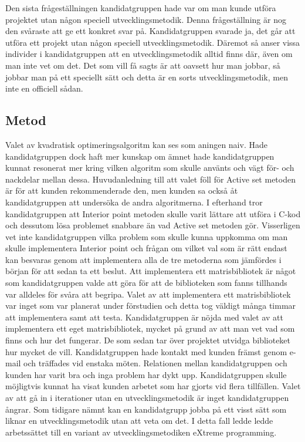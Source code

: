 \newline
\newline
Den sista frågeställningen kandidatgruppen hade var om man kunde utföra projektet utan någon speciell utvecklingsmetodik. Denna frågeställning är nog den svåraste att ge ett konkret svar på. Kandidatgruppen svarade ja, det går att utföra ett projekt utan någon speciell utvecklingsmetodik. Däremot så anser vissa individer i kandidatgruppen att en utvecklingsmetodik alltid finns där, även om man inte vet om det. Det som vill få sagts är att oavsett hur man jobbar, så jobbar man på ett speciellt sätt och detta är en sorts utvecklingsmetodik, men inte en officiell sådan.

\subsection{Metod}
Valet av kvadratisk optimeringsalgoritm kan ses som aningen naiv. Hade kandidatgruppen dock haft mer kunskap om ämnet hade kandidatgruppen kunnat resonerat mer kring vilken algoritm som skulle använts och vägt för- och nackdelar mellan dessa. Huvudanledning till att valet föll för Active set metoden är för att kunden rekommenderade den, men kunden sa också åt kandidatgruppen att undersöka de andra algoritmerna. I efterhand tror kandidatgruppen att Interior point metoden skulle varit lättare att utföra i C-kod och dessutom lösa problemet snabbare än vad Active set metoden gör. Visserligen vet inte kandidatgruppen vilka problem som skulle kunna uppkomma om man skulle implementera Interior point och frågan om vilket val som är rätt endast kan besvaras genom att implementera alla de tre metoderna som jämfördes i början för att sedan ta ett beslut.
\newline
\newline
Att implementera ett matrisbibliotek är något som kandidatgruppen valde att göra för att de biblioteken som fanns tillhands var alldeles för svåra att begripa. Valet av att implementera ett matrisbibliotek var inget som var planerat under förstudien och detta tog väldigt många timmar att implementera samt att testa. Kandidatgruppen är nöjda med valet av att implementera ett eget matrisbibliotek, mycket på grund av att man vet vad som finns och hur det fungerar. De som sedan tar över projektet utvidga biblioteket hur mycket de vill.
\newline
\newline
Kandidatgruppen hade kontakt med kunden främst genom e-mail och träffades vid enstaka möten. Relationen mellan kandidatgruppen och kunden har varit bra och inga problem har dykt upp. Kandidatgruppen skulle möjligtvis kunnat ha visat kunden arbetet som har gjorts vid flera tillfällen. 
\newline
\newline
Valet av att gå in i iterationer utan en utvecklingsmetodik är inget kandidatgruppen ångrar. Som tidigare nämnt kan en kandidatgrupp jobba på ett visst sätt som liknar en utvecklingsmetodik utan att veta om det. I detta fall ledde ledde arbetssättet till en variant av utvecklingsmetodiken eXtreme programming.


